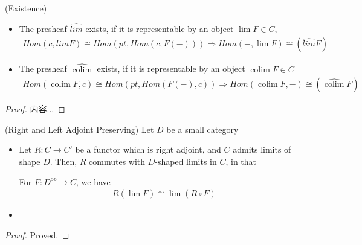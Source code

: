 \documentclass[Total.tex]{subfiles}
\begin{document}
					\begin{proposition}
						(Existence)
						\begin{itemize}
							\item The presheaf $\hat{lim}$ exists, if it  is representable by an object $\lim F\in C$, 
							\begin{gather*}
								Hom(c,limF)\cong Hom(pt, Hom(c,F(-)))\Rightarrow Hom(-,\lim F)\cong (\hat{lim} F)
							\end{gather*}
							
							\item The presheaf $\hat{\operatorname{colim}}$ exists, if it is representable by an object $\operatorname{colim} F\in C$
							\begin{gather*}
								Hom(\operatorname{colim} F,c)\cong Hom(pt,Hom(F(-),c))\Rightarrow Hom(\operatorname{colim} F,-)\cong (\hat{\operatorname{colim}} F)
							\end{gather*}
						\end{itemize}
					\end{proposition}
					\begin{proof}
						内容...
					\end{proof}
					
					\begin{proposition}
						(Right and Left Adjoint Preserving) Let $D$ be a small category
						\begin{itemize}
							\item Let $R:C\rightarrow C'$ be a functor which is right adjoint, and $C$ admits limits of shape $D$. Then, $R$ commutes with $D$-shaped limits in $C$, in that
							
							For $F:D^{op}\rightarrow C$, we have
							\begin{gather*}
								R(\lim F)\cong \lim(R\circ F)
							\end{gather*}
							\item 
						\end{itemize}
					\end{proposition}
					\begin{proof}
						Proved.
					\end{proof}
					
\end{document}

